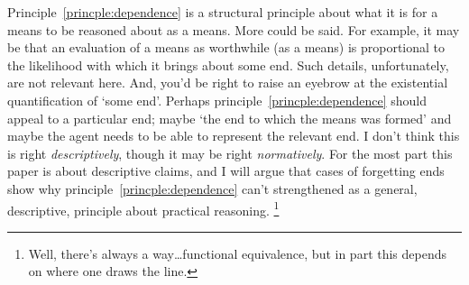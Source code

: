 \documentclass[10pt]{article}
\begin{document}
Principle~\ref{princple:dependence} is a structural principle about what it is for a means to be reasoned about as a means.
More could be said.
For example, it may be that an evaluation of a means as worthwhile (as a means) is proportional to the likelihood with which it brings about some end.
Such details, unfortunately, are not relevant here.
And, you'd be right to raise an eyebrow at the existential quantification of `some end'.
Perhaps principle~\ref{princple:dependence} should appeal to a particular end; maybe `the end to which the means was formed' and maybe the agent needs to be able to represent the relevant end.
I don't think this is right \emph{descriptively}, though it may be right \emph{normatively}.
For the most part this paper is about descriptive claims, and I will argue that cases of forgetting ends show why principle~\ref{princple:dependence} can't strengthened as a general, descriptive, principle about practical reasoning.\nolinebreak
\footnote{Well, there's always a way\dots functional equivalence, but in part this depends on where one draws the line.}

\end{document}
